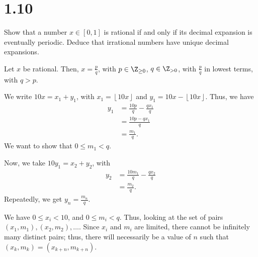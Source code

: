\documentclass[10pt]{mypackage}
\begin{document}
\section{1.10}%
\begin{problem}
  Show that a number $x\in [0,1]$ is rational if and only if its decimal expansion is eventually periodic. Deduce that irrational numbers have unique decimal expansions.
\end{problem}
\begin{solution}
  Let $x$ be rational. Then, $x = \frac{p}{q}$, with $p\in \Z_{\geq0}$, $q\in \Z_{> 0}$, with $\frac{p}{q}$ in lowest terms, with $q > p$.\newline

  We write $10x = x_1 + y_1$, with $x_1 = \left\lfloor 10x\right\rfloor$ and $y_1 = 10x - \left\lfloor 10x\right\rfloor$. Thus, we have
  \begin{align*}
    y_1 &= \frac{10p}{q} - \frac{qx_1}{q}\\
        &= \frac{10p - qx_1}{q}\\
        &= \frac{m_1}{q}.
  \end{align*}
  We want to show that $0 \leq m_1 < q$.\newline

  Now, we take $10y_1 = x_2 + y_2$, with
  \begin{align*}
    y_2 &= \frac{10 m_1}{q} - \frac{qx_2}{q}\\
        &= \frac{m_2}{q}.
  \end{align*}
  Repeatedly, we get $y_n = \frac{m_n}{q}$.\newline

  We have $0 \leq x_i < 10$, and $0 \leq m_i < q$. Thus, looking at the set of pairs $\left(x_1,m_1\right),\left(x_2,m_2\right),\dots$. Since $x_i$ and $m_i$ are limited, there cannot be infinitely many distinct pairs; thus, there will necessarily be a value of $n$ such that $\left(x_k,m_k\right) = \left(x_{k+n},m_{k+n}\right)$.
\end{solution}
\end{document}
